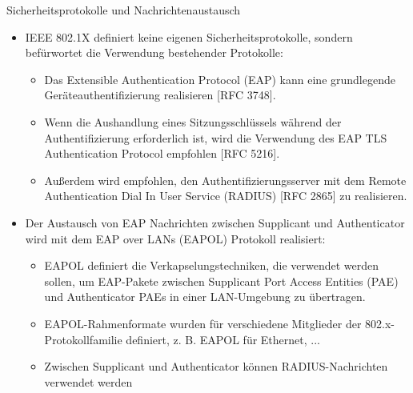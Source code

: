 \documentclass[a4paper]{article}
\begin{document}
\begin{multicols}{3}
    Sicherheitsprotokolle und Nachrichtenaustausch

    \begin{itemize}
        \item
              IEEE 802.1X definiert keine eigenen Sicherheitsprotokolle, sondern
              befürwortet die Verwendung bestehender Protokolle:

              \begin{itemize}
                  \item
                        Das Extensible Authentication Protocol (EAP) kann eine grundlegende
                        Geräteauthentifizierung realisieren {[}RFC 3748{]}.
                  \item
                        Wenn die Aushandlung eines Sitzungsschlüssels während der
                        Authentifizierung erforderlich ist, wird die Verwendung des EAP TLS
                        Authentication Protocol empfohlen {[}RFC 5216{]}.
                  \item
                        Außerdem wird empfohlen, den Authentifizierungsserver mit dem Remote
                        Authentication Dial In User Service (RADIUS) {[}RFC 2865{]} zu
                        realisieren.
              \end{itemize}
        \item
              Der Austausch von EAP Nachrichten zwischen Supplicant und
              Authenticator wird mit dem EAP over LANs (EAPOL) Protokoll realisiert:

              \begin{itemize}
                  \item
                        EAPOL definiert die Verkapselungstechniken, die verwendet werden
                        sollen, um EAP-Pakete zwischen Supplicant Port Access Entities (PAE)
                        und Authenticator PAEs in einer LAN-Umgebung zu übertragen.
                  \item
                        EAPOL-Rahmenformate wurden für verschiedene Mitglieder der
                        802.x-Protokollfamilie definiert, z. B. EAPOL für Ethernet, ...
                  \item
                        Zwischen Supplicant und Authenticator können RADIUS-Nachrichten
                        verwendet werden
              \end{itemize}
    \end{itemize}


\end{multicols}
\end{document}
